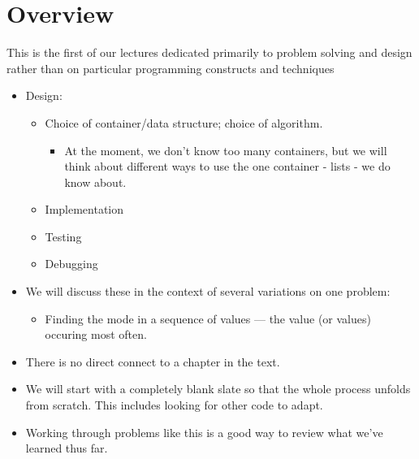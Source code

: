 \documentclass[letterpaper,10pt,english]{sphinxmanual}
\begin{document}
\section{Overview}
\label{\detokenize{lecture_notes/lec14_design_part1:overview}}
This is the first of our lectures dedicated primarily to problem
solving and design rather than on particular programming constructs
and techniques
\begin{itemize}
\item {} 
Design:
\begin{itemize}
\item {} 
Choice of container/data structure; choice of algorithm.
\begin{itemize}
\item {} 
At the moment, we don’t know too many containers, but we will
think about different ways to use the one container - lists -
we do know about.

\end{itemize}

\item {} 
Implementation

\item {} 
Testing

\item {} 
Debugging

\end{itemize}

\item {} 
We will discuss these in the context of several variations on one
problem:
\begin{itemize}
\item {} 
Finding the mode in a sequence of values — the value (or values)
occuring most often.

\end{itemize}

\item {} 
There is no direct connect to a chapter in the text.

\item {} 
We will start with a completely blank slate so that the whole process
unfolds from scratch. This includes looking for other code to
adapt.

\item {} 
Working through problems like this is a good way to review what
we’ve learned thus far.

\end{itemize}
\end{document}
